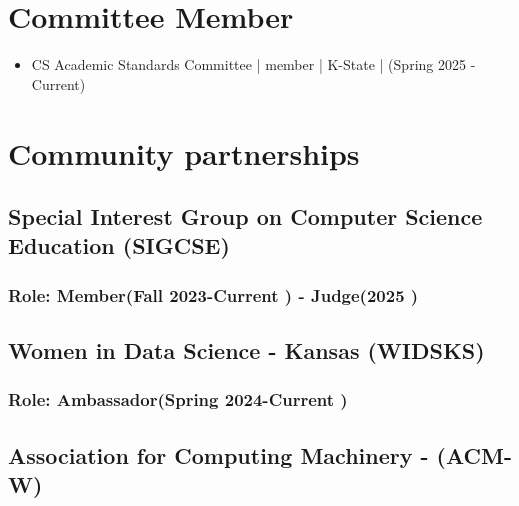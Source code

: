 \documentclass[11pt]{article}
\begin{document}
\section{Committee Member} %
\begin{itemize}
    \item  CS Academic Standards Committee  | member | K-State | (Spring 2025 - Current)
\end{itemize}







\section{Community partnerships} 
\subsection{ Special Interest Group on Computer Science Education (SIGCSE) \hfill  \normalfont   }
\subsubsection{ \normalfont Role: Member(Fall 2023-Current {\href{https://www.sigcse.org/} {\color{icnclr} \faGlobe[regular] }}) - Judge(2025 {\href{https://www.linkedin.com/posts/safiamalallah_sigcse2025-sigcse2025-activity-7301434956394770435-hOr1?utm_source=share&utm_medium=member_desktop&rcm=ACoAABJKbzEBmgHMDtElQ0_iQOO7nV-6MmS9_-w}{\color{icnclr} \faGlobe[regular]}}) }

\vspace{0.5em} %

\subsection{ Women in Data Science - Kansas (WIDSKS)\hfill  \normalfont   }
\subsubsection{ \normalfont Role: Ambassador(Spring 2024-Current {\href{https://www.widsworldwide.org/get-inspired/blog/people/safia-malallah/}{\color{icnclr} \faGlobe[regular] }}) }
\vspace{0.5em} %
\subsection{Association for Computing Machinery - (ACM-W) \hfill  \normalfont    }
\end{document}
